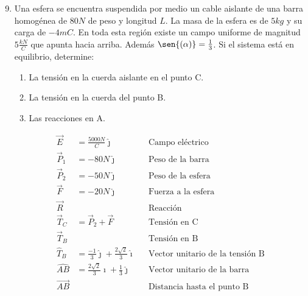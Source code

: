 \documentclass[12pt, twoside]{article}
\begin{document}
\begin{enumerate}
	\setcounter{enumi}{8}
	\item Una esfera se encuentra suspendida por medio un cable aislante
		de una barra homogénea de $80N$ de peso y longitud $L$.
		La masa de la esfera es de $5kg$ y su carga de $-4mC$.
		En toda esta región existe un campo uniforme de magnitud $5 \frac{kN}{C}$
		que apunta hacia arriba.
		Además $\sen{(\alpha)}=\frac{1}{3}$.
		Si el sistema está en equilibrio, determine:
		\begin{enumerate}
			\item La tensión en la cuerda aislante en el punto C.

			\item La tensión en la cuerda del punto B.

			\item Las reacciones en A.
		\end{enumerate}
		\begin{align*}
			\vec{E} &= \frac{5000N}{C} \hat{\jmath} && \text{Campo eléctrico}\\
			\vec{P}_1 &= -80N\hat{\jmath} && \text{Peso de la barra}\\
			\vec{P}_2 &= -50N\hat{\jmath} && \text{Peso de la esfera}\\
			\vec{F} &= -20N \hat{\jmath} && \text{Fuerza a la esfera}\\
			\vec{R} & && \text{Reacción}\\
			\vec{T}_C &= \vec{P}_2 + \vec{F} && \text{Tensión en C}\\
			\vec{T}_B & && \text{Tensión en B}\\
			\hat{T}_B &= \frac{-1}{3} \hat{\jmath}+
			\frac{2\sqrt{2}}{3} \hat{\imath} && \text{Vector unitario de la tensión B}\\
			\hat{AB} &= \frac{2\sqrt{2}}{3} \hat{\imath}+
			\frac{1}{3} \hat{\jmath} && \text{Vector unitario de la barra}\\
			\vec{AB} & && \text{Distancia hasta el punto B}
		\end{align*}


\end{enumerate}
\end{document}
